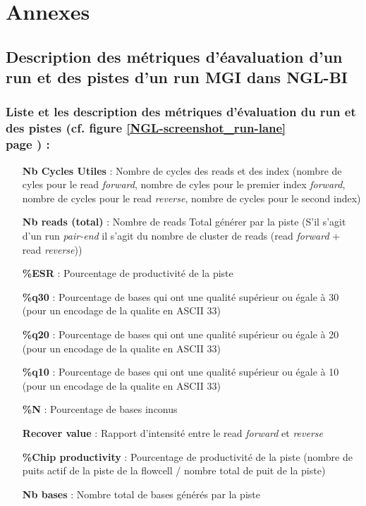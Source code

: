 \section{Annexes}
\subsection*{Description des métriques d'éavaluation d'un run et des pistes d'un run MGI dans NGL-BI}
\label{anexes1}
\subsubsection*{Liste et les description des métriques d'évaluation du run et des pistes (cf. figure \ref{NGL-screenshot_run-lane} \\page \pageref{NGL-screenshot_run-lane}) :}
\begin{itemize}
    \item[\textbf{Nb Cycles Utiles} :] Nombre de cycles des reads et des index (nombre de cyles pour le read \emph{forward}, nombre de cyles pour le premier index  \emph{forward}, nombre de cycles pour le read \emph{reverse}, nombre de cycles pour le second index)
    \item[\textbf{Nb reads (total)} :] Nombre de reads Total générer par la piste (S'il s'agit d'un run \emph{pair-end} il s'agit du nombre de cluster de reads (read \emph{forward} + read \emph{reverse}))
    \item[\textbf{\%ESR} :] Pourcentage de productivité de la piste
    \item[\textbf{\%q30} :] Pourcentage de bases qui ont une qualité supérieur ou égale à 30 (pour un encodage de la qualite en ASCII 33)
    \item[\textbf{\%q20} :] Pourcentage de bases qui ont une qualité supérieur ou égale à 20 (pour un encodage de la qualite en ASCII 33)
    \item[\textbf{\%q10} :] Pourcentage de bases qui ont une qualité supérieur ou égale à 10 (pour un encodage de la qualite en ASCII 33)
    \item[\textbf{\%N} :] Pourcentage de bases inconus
    \item[\textbf{Recover value} :] Rapport d'intensité entre le read \emph{forward} et \emph{reverse}
    \item[\textbf{\%Chip productivity} :] Pourcentage de productivité de la piste (nombre de puits actif de la piste de la flowcell / nombre total de puit de la piste)
    \item[\textbf{Nb bases} :] Nombre total de bases générés par la piste

\end{itemize}
